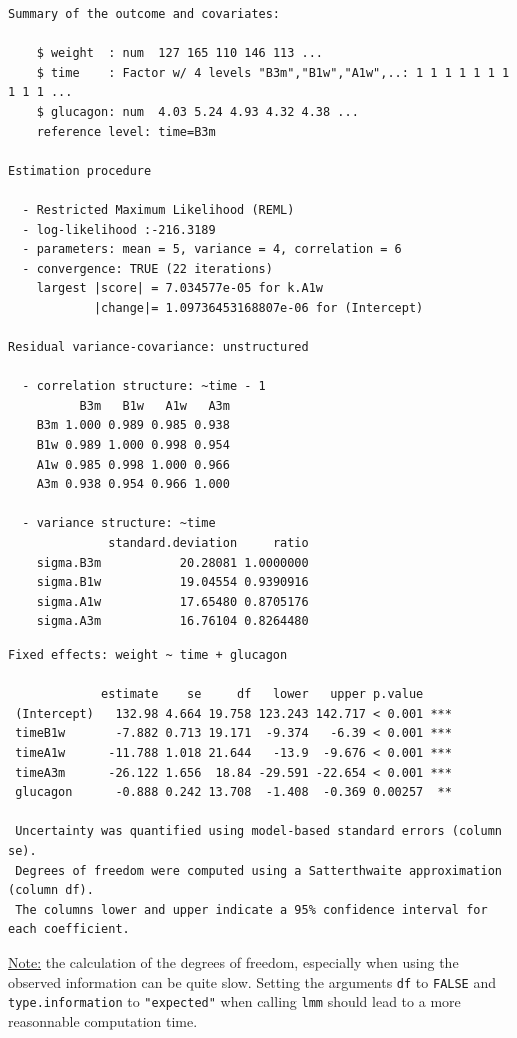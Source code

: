 \documentclass[12pt]{article}
\begin{document}
\begin{verbatim}
Summary of the outcome and covariates: 

    $ weight  : num  127 165 110 146 113 ...
    $ time    : Factor w/ 4 levels "B3m","B1w","A1w",..: 1 1 1 1 1 1 1 1 1 1 ...
    $ glucagon: num  4.03 5.24 4.93 4.32 4.38 ...
    reference level: time=B3m 

Estimation procedure 

  - Restricted Maximum Likelihood (REML) 
  - log-likelihood :-216.3189
  - parameters: mean = 5, variance = 4, correlation = 6
  - convergence: TRUE (22 iterations) 
    largest |score| = 7.034577e-05 for k.A1w
            |change|= 1.09736453168807e-06 for (Intercept)
 
Residual variance-covariance: unstructured 

  - correlation structure: ~time - 1 
          B3m   B1w   A1w   A3m
    B3m 1.000 0.989 0.985 0.938
    B1w 0.989 1.000 0.998 0.954
    A1w 0.985 0.998 1.000 0.966
    A3m 0.938 0.954 0.966 1.000

  - variance structure: ~time 
              standard.deviation     ratio
    sigma.B3m           20.28081 1.0000000
    sigma.B1w           19.04554 0.9390916
    sigma.A1w           17.65480 0.8705176
    sigma.A3m           16.76104 0.8264480
\end{verbatim}

\clearpage

\begin{verbatim}
Fixed effects: weight ~ time + glucagon 
 
             estimate    se     df   lower   upper p.value    
 (Intercept)   132.98 4.664 19.758 123.243 142.717 < 0.001 ***
 timeB1w       -7.882 0.713 19.171  -9.374   -6.39 < 0.001 ***
 timeA1w      -11.788 1.018 21.644   -13.9  -9.676 < 0.001 ***
 timeA3m      -26.122 1.656  18.84 -29.591 -22.654 < 0.001 ***
 glucagon      -0.888 0.242 13.708  -1.408  -0.369 0.00257  **
 
 Uncertainty was quantified using model-based standard errors (column se). 
 Degrees of freedom were computed using a Satterthwaite approximation (column df). 
 The columns lower and upper indicate a 95% confidence interval for each coefficient.
\end{verbatim}

\uline{Note:} the calculation of the degrees of freedom, especially when
using the observed information can be quite slow. Setting the
arguments \texttt{df} to \texttt{FALSE} and \texttt{type.information} to \texttt{"expected"} when
calling \texttt{lmm} should lead to a more reasonnable computation time.
\end{document}
